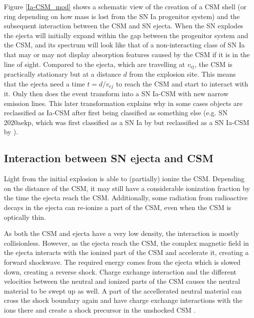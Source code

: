 \documentclass[a4paper,oneside,12pt, class=Latex/Classes/PhDthesisPSnPDF, crop=false]{standalone}
\begin{document}
Figure \ref{Ia-CSM_mod} shows a schematic view of the creation of a CSM shell (or ring depending on how mass is lost from the SN Ia progenitor system) and the subsequent interaction between the CSM and SN ejecta. When the SN explodes the ejecta will initially expand within the gap between the progenitor system and the CSM, and its spectrum will look like that of a non-interacting class of SN Ia that may or may not display absorption features caused by the CSM if it is in the line of sight. Compared to the ejecta, which are travelling at $v_\text{ej}$, the CSM is practically stationary but at a distance $d$ from the explosion site. This means that the ejecta need a time $t=d/v_{ej}$ to reach the CSM and start to interact with it. Only then does the event transform into a SN Ia-CSM with new narrow emission lines. This later transformation explains why in some cases objects are reclassified as Ia-CSM after first being classified as something else (e.g. SN 2020aekp, which was first classified as a SN Ia by \citealt{2020aekp_1st_classif} but reclassified as a SN Ia-CSM by \citealt{2020aekp_reclassif}).


\subsection{Interaction between SN ejecta and CSM}
Light from the initial explosion is able to (partially) ionize the CSM. Depending on the distance of the CSM, it may still have a considerable ionization fraction by the time the ejecta reach the CSM. Additionally, some radiation from radioactive decays in the ejecta can re-ionize a part of the CSM, even when the CSM is optically thin.

As both the CSM and ejecta have a very low density, the interaction is mostly collisionless. However, as the ejecta reach the CSM, the complex magnetic field in the ejecta interacts with the ionized part of the CSM and accelerate it, creating a forward shockwave. The required energy comes from the ejecta which is slowed down, creating a reverse shock. Charge exchange interaction and the different velocities between the neutral and ionized parts of the CSM causes the neutral material to be swept up as well. A part of the accellerated neutral material can cross the shock boundary again and have charge exchange interactions with the ions there and create a shock precursor in the unshocked CSM \citep{CSM_interaction_microphysics}.
\end{document}
